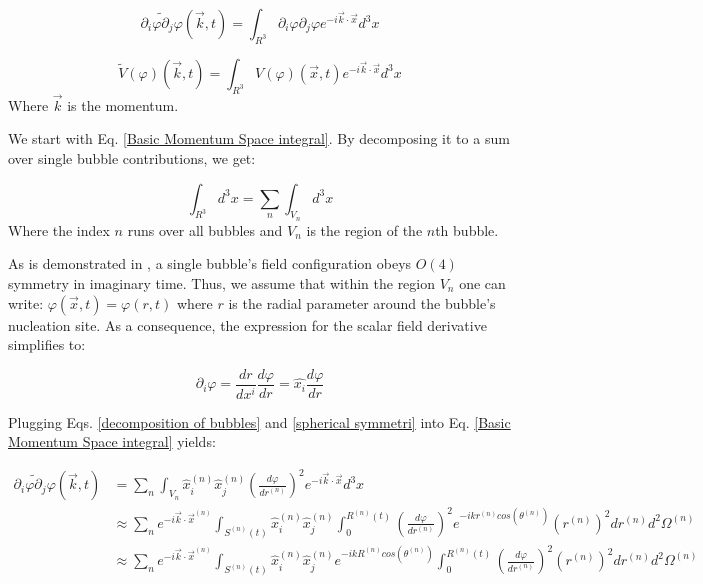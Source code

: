 \documentclass{article}
\begin{document}
\begin{equation}\label{Basic Momentum Space integral}
    \widetilde{\partial_i\varphi\partial_j\varphi}(\overrightarrow{k}, t) = \int_{R^3}\partial_i\varphi\partial_j\varphi e^{-i\overrightarrow{k}\cdot\overrightarrow{x}}d^3x
\end{equation}

\begin{equation}\label{Basic Volume Momentum Space integral}
    \widetilde{V}(\varphi)(\overrightarrow{k}, t) = \int_{R^3}V(\varphi)(\overrightarrow{x}, t) e^{-i\overrightarrow{k}\cdot\overrightarrow{x}}d^3x
\end{equation}
Where $\overrightarrow{k}$ is the momentum.

We start with Eq. \ref{Basic Momentum Space integral}. By decomposing it to a sum over single bubble contributions, we get:

\begin{equation} \label{decomposition of bubbles}
    \int_{R^3} d^3x=\sum_n \int_{V_n}d^3x
\end{equation}
Where the index $n$ runs over all bubbles and $V_n$ is the region of the $n$th bubble.

As is demonstrated in \cite{coleman}, a single bubble's field configuration obeys $O(4)$ symmetry in imaginary time. Thus, we assume that within the region $V_n$ 
one can write:
$\varphi(\overrightarrow{x}, t) = \varphi(r, t)$
where $r$ is the radial parameter around the bubble's nucleation site.
As a consequence, the expression for the scalar field derivative simplifies to:

\begin{equation} \label{spherical symmetri}
    \partial_i\varphi = \frac{dr}{dx^i} \frac{d\varphi}{dr} = \hat{x_i} \frac{d\varphi}{dr}
\end{equation}

Plugging Eqs. \ref{decomposition of bubbles} and \ref{spherical symmetri} into Eq. \ref{Basic Momentum Space integral} yields:

\begin{equation} \label{intermediate momentum space integral}
    \begin{aligned}
        \widetilde{\partial_i\varphi\partial_j\varphi}(\overrightarrow{k}, t) &= \sum_n \int_{V_n}\hat{{x}}^{(n)}_i\hat{x}^{(n)}_j{(\frac{d\varphi}{dr^{(n)}})}^2 e^{-i\overrightarrow{k}\cdot\overrightarrow{x}}d^3x\\
        & \approx \sum_n e^{-i\overrightarrow{k}\cdot\overrightarrow{x}^{(n)}} \int_{S^{(n)}(t)} \hat{x}_i^{(n)}\hat{x}_j^{(n)}\int_0^{R^{(n)}(t)}{(\frac{d\varphi}{dr^{(n)}})}^2 e^{-ikr^{(n)}cos(\theta^{(n)})} (r^{(n)})^2 dr^{(n)}d^2\Omega^{(n)}\\
        & \approx \sum_n e^{-i\overrightarrow{k}\cdot\overrightarrow{x}^{(n)}} \int_{S^{(n)}(t)} \hat{x}_i^{(n)}\hat{x}_j^{(n)} e^{-ikR^{(n)} cos(\theta^{(n)})} \int_0^{R^{(n)}(t)}{(\frac{d\varphi}{dr^{(n)}})}^2 (r^{(n)})^2dr^{(n)}d^2\Omega^{(n)}
    \end{aligned}   
\end{equation}
\end{document}

